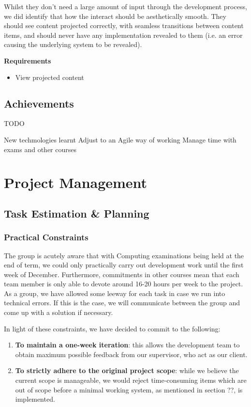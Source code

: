 \documentclass[a4paper, titlepage]{article}
\begin{document}
Whilst they don't need a large amount of input through the development process, we did identify that how the interact should be aesthetically smooth. They should see content projected correctly, with seamless transitions between content items, and should never have any implementation revealed to them (i.e. an error causing the underlying system to be revealed).

\textbf{Requirements}
\begin{itemize}
\item View projected content
\end{itemize}


\subsection{Achievements}
TODO

New techmologies learnt
Adjust to an Agile way of working
Manage time with exams and other courses


\newpage
\section{Project Management}

\subsection{Task Estimation \& Planning}

\subsubsection{Practical Constraints}
The group is acutely aware that with Computing examinations being held at the
end of term, we could only practically carry out development work until the
first week of December. Furthermore, commitments in other courses mean that 
each team member is only able to devote around 16-20 hours per week to
the project. As a group, we have allowed some leeway for each task in case we run into technical errors. If this is the case, we will communicate between the group and come up with a solution if necessary.

In light of these constraints, we have decided to commit to the following:
\begin{enumerate}
  \item \textbf{To maintain a one-week iteration}: this allows the development team to
        obtain maximum possible feedback from our supervisor, who act as our client.
  \item \textbf{To strictly adhere to the original project scope}: while we believe the
        current scope is manageable, we would reject time-consuming items which
        are out of scope before a minimal working system, as mentioned in section ??, is implemented.
\end{enumerate}
\end{document}
